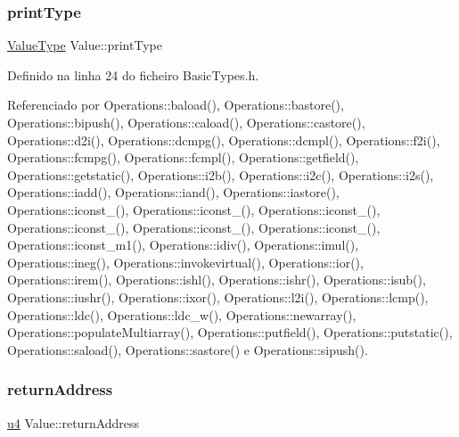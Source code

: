 \mbox{\label{structValue_aa4139e3895034b3b47155a5862ea2010}} 
\subsubsection{\texorpdfstring{print\+Type}{printType}}
{\footnotesize\ttfamily \hyperlink{BasicTypes_8h_ad9971b6ef33e02ba2c75d19c1d2518a1}{Value\+Type} Value\+::print\+Type}



Definido na linha 24 do ficheiro Basic\+Types.\+h.



Referenciado por Operations\+::baload(), Operations\+::bastore(), Operations\+::bipush(), Operations\+::caload(), Operations\+::castore(), Operations\+::d2i(), Operations\+::dcmpg(), Operations\+::dcmpl(), Operations\+::f2i(), Operations\+::fcmpg(), Operations\+::fcmpl(), Operations\+::getfield(), Operations\+::getstatic(), Operations\+::i2b(), Operations\+::i2c(), Operations\+::i2s(), Operations\+::iadd(), Operations\+::iand(), Operations\+::iastore(), Operations\+::iconst\+\_(), Operations\+::iconst\+\_(), Operations\+::iconst\+\_(), Operations\+::iconst\+\_(), Operations\+::iconst\+\_(), Operations\+::iconst\+\_(), Operations\+::iconst\+\_\+m1(), Operations\+::idiv(), Operations\+::imul(), Operations\+::ineg(), Operations\+::invokevirtual(), Operations\+::ior(), Operations\+::irem(), Operations\+::ishl(), Operations\+::ishr(), Operations\+::isub(), Operations\+::iushr(), Operations\+::ixor(), Operations\+::l2i(), Operations\+::lcmp(), Operations\+::ldc(), Operations\+::ldc\+\_\+w(), Operations\+::newarray(), Operations\+::populate\+Multiarray(), Operations\+::putfield(), Operations\+::putstatic(), Operations\+::saload(), Operations\+::sastore() e Operations\+::sipush().

\mbox{\label{structValue_a0ff202a46baf275595d520cf800f596e}} 
\subsubsection{\texorpdfstring{return\+Address}{returnAddress}}
{\footnotesize\ttfamily \hyperlink{BasicTypes_8h_ae5be1f726785414dd1b77d60df074c9d}{u4} Value\+::return\+Address}



